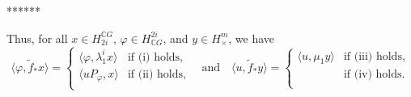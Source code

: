 \documentclass{amsart}
\begin{document}

	
	

\iffalse
******

Thus, for all $x \in H^{\mathbb CG}_{2i}$, $\varphi \in H^{2i}_{\mathbb CG}$, and $y \in H^m_\times$, we have
\begin{equation}\label{}
	\langle \varphi, \tilde f_* x\rangle =
	\begin{cases}
		\langle \varphi, \lambda_1^i x\rangle & \text{if (i) holds,} \\
		\langle u P_{\varphi}, x\rangle & \text{if (ii) holds},\\
	\end{cases}
	\quad \text{and} \quad
	\langle u, \tilde f_* y\rangle =
	\begin{cases}
		\langle u, \mu_1 y\rangle & \text{if (iii) holds,} \\
		& \text{if (iv) holds}.\\
	\end{cases}
\end{equation}
\end{document}
